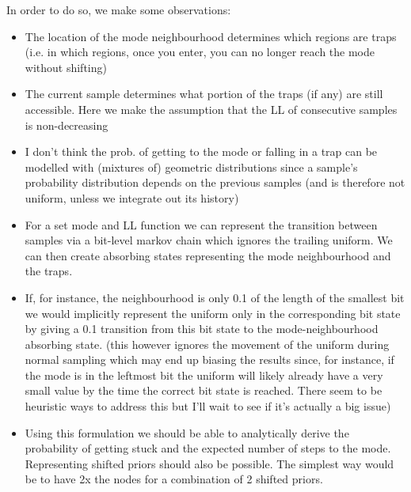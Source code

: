 In order to do so, we make some observations:
\begin{itemize}

\item
The location of the mode neighbourhood determines which regions are traps (i.e. in which regions, once you enter, you can no longer reach the mode without shifting)

\item
The current sample determines what portion of the traps (if any) are still accessible. Here we make the assumption that the LL of consecutive samples is non-decreasing

\item
I don't think the prob. of getting to the mode or falling in a trap can be modelled with (mixtures of) geometric distributions since a sample's probability distribution depends on the previous samples (and is therefore not uniform, unless we integrate out its history)

\item
For a set mode and LL function we can represent the transition between samples via a bit-level markov chain which ignores the trailing uniform. We can then create absorbing states representing the mode neighbourhood and the traps.

\item
 If, for instance, the neighbourhood is only 0.1 of the length of the smallest bit we would implicitly represent the uniform only in the corresponding bit state by giving a 0.1 transition from this bit state to the mode-neighbourhood absorbing state. (this however ignores the movement of the uniform during normal sampling which may end up biasing the results since, for instance, if the mode is in the leftmost bit the uniform will likely already have a very small value by the time the correct bit state is reached. There seem to be heuristic ways to address this but I'll wait to see if it's actually a big issue)

\item
Using this formulation we should be able to analytically derive the probability of getting stuck and the expected number of steps to the mode. Representing shifted priors should also be possible. The simplest way would be to have 2x the nodes for a combination of 2 shifted priors.

\end{itemize}


